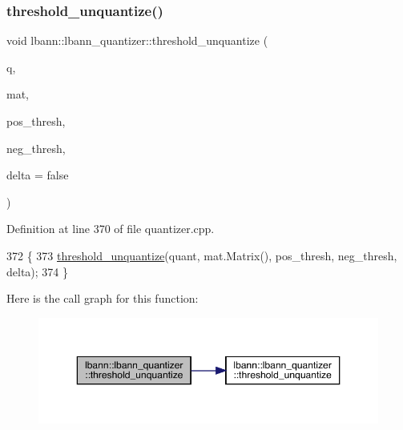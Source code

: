 \subsubsection{\texorpdfstring{threshold\+\_\+unquantize()}{threshold\_unquantize()}\hspace{0.1cm}{\footnotesize\ttfamily [2/2]}}
{\footnotesize\ttfamily void lbann\+::lbann\+\_\+quantizer\+::threshold\+\_\+unquantize (\begin{DoxyParamCaption}\item[{const \hyperlink{classlbann_1_1lbann__quantizer_a85ea8e298c2975b4f802855278406aa7}{Thresh\+Quantized} \&}]{q,  }\item[{\hyperlink{base_8hpp_a0fab5387556805cfeac3e7e567bf66c5}{Dist\+Mat} \&}]{mat,  }\item[{Data\+Type}]{pos\+\_\+thresh,  }\item[{Data\+Type}]{neg\+\_\+thresh,  }\item[{bool}]{delta = {\ttfamily false} }\end{DoxyParamCaption})}



Definition at line 370 of file quantizer.\+cpp.


\begin{DoxyCode}
372                                    \{
373   \hyperlink{classlbann_1_1lbann__quantizer_a0f5f3b0149715ab59202b8884a87c7d5}{threshold\_unquantize}(quant, mat.Matrix(), pos\_thresh, neg\_thresh, delta);
374 \}
\end{DoxyCode}
Here is the call graph for this function\+:\nopagebreak
\begin{figure}[H]
\begin{center}
\leavevmode
\includegraphics[width=350pt]{classlbann_1_1lbann__quantizer_a2324bba3cbb6c0d3e51bbe21555e7f1a_cgraph}
\end{center}
\end{figure}
\mbox{\label{classlbann_1_1lbann__quantizer_ab12b432ba2901347b025e8b6ec40a3c6}} 

